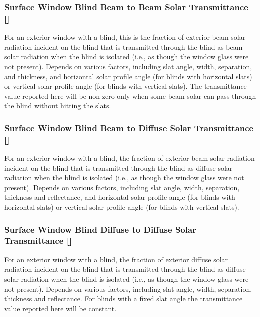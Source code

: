 \subsubsection{Surface Window Blind Beam to Beam Solar Transmittance {[]}}\label{surface-window-blind-beam-to-beam-solar-transmittance}

For an exterior window with a blind, this is the fraction of exterior beam solar radiation incident on the blind that is transmitted through the blind as beam solar radiation when the blind is isolated (i.e., as though the window glass were not present). Depends on various factors, including slat angle, width, separation, and thickness, and horizontal solar profile angle (for blinds with horizontal slats) or vertical solar profile angle (for blinds with vertical slats). The transmittance value reported here will be non-zero only when some beam solar can pass through the blind without hitting the slats.

\subsubsection{Surface Window Blind Beam to Diffuse Solar Transmittance {[]}}\label{surface-window-blind-beam-to-diffuse-solar-transmittance}

For an exterior window with a blind, the fraction of exterior beam solar radiation incident on the blind that is transmitted through the blind as diffuse solar radiation when the blind is isolated (i.e., as though the window glass were not present). Depends on various factors, including slat angle, width, separation, thickness and reflectance, and horizontal solar profile angle (for blinds with horizontal slats) or vertical solar profile angle (for blinds with vertical slats).

\subsubsection{Surface Window Blind Diffuse to Diffuse Solar Transmittance {[]}}\label{surface-window-blind-diffuse-to-diffuse-solar-transmittance}

For an exterior window with a blind, the fraction of exterior diffuse solar radiation incident on the blind that is transmitted through the blind as diffuse solar radiation when the blind is isolated (i.e., as though the window glass were not present). Depends on various factors, including slat angle, width, separation, thickness and reflectance. For blinds with a fixed slat angle the transmittance value reported here will be constant.


